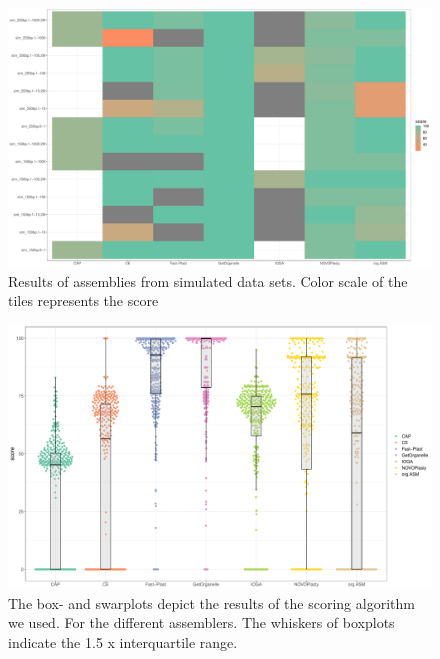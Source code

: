 \documentclass{bmcart}
\begin{document}
\begin{backmatter}
\begin{figure}[h!]
  \includegraphics[width=\textwidth]{plots/sim_tiles.pdf}
  \caption{
      Results of assemblies from simulated data sets. Color scale of the tiles represents the score }
      \label{fig:simulated}
      \end{figure}

  \begin{figure}[h!]
  \includegraphics[width=\textwidth]{plots/swarm.pdf}
  \caption{
  The box- and swarplots depict the results of the scoring algorithm we used. For the different assemblers. The whiskers of boxplots indicate the 1.5 x interquartile range. 
    }
      \label{fig:swarmplot}
      \end{figure}


\end{backmatter}
\end{document}
